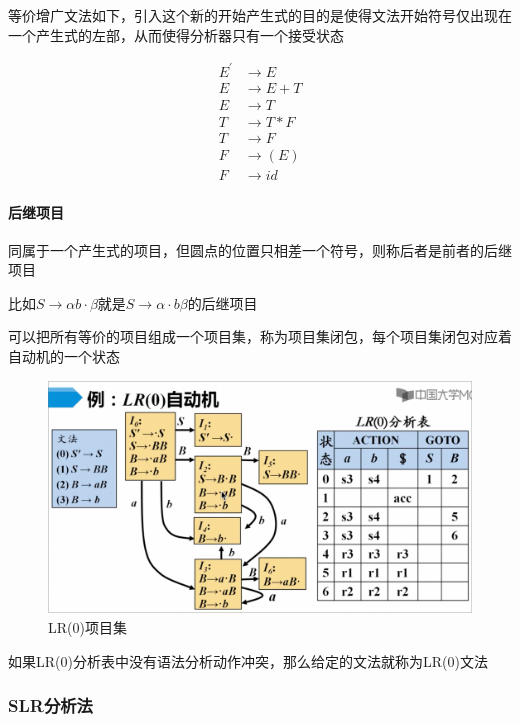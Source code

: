 \documentclass[UTF8]{ctexart} %
\begin{document}
等价增广文法如下，引入这个新的开始产生式的目的是使得文法开始符号仅出现在一个产生式的左部，从而使得分析器只有一个接受状态

\begin{equation}
    \begin{aligned}
        E^{'} & \rightarrow E   \\
        E     & \rightarrow E+T \\
        E     & \rightarrow T   \\
        T     & \rightarrow T*F \\
        T     & \rightarrow F   \\
        F     & \rightarrow (E) \\
        F     & \rightarrow id
    \end{aligned}
\end{equation}

\paragraph{后继项目} 同属于一个产生式的项目，但圆点的位置只相差一个符号，则称后者是前者的后继项目

比如$S\rightarrow \alpha b\cdot \beta$就是$S\rightarrow \alpha \cdot b \beta$的后继项目

可以把所有等价的项目组成一个项目集，称为项目集闭包，每个项目集闭包对应着自动机的一个状态

\begin{figure}[H]
    \centering
    \includegraphics[width=\textwidth]{assets/LR0.png}
    \caption{LR(0)项目集}
\end{figure}

如果LR(0)分析表中没有语法分析动作冲突，那么给定的文法就称为LR(0)文法

\subsubsection{SLR分析法}
\end{document}

